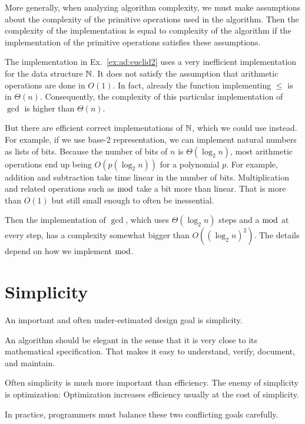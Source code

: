 More generally, when analyzing algorithm complexity, we must make assumptions about the complexity of the primitive operations used in the algorithm.
Then the complexity of the implementation is equal to complexity of the algorithm if the implementation of the primitive operations satisfies these assumptions.

\begin{example}\label{ex:ad:euclid3}
The implementation in Ex.~\ref{ex:ad:euclid2} uses a very inefficient implementation for the data structure $\mathbb{N}$.
It does not satisfy the assumption that arithmetic operations are done in $O(1)$.
In fact, already the function implementing $\leq$ is in $\Theta(n)$.
Consequently, the complexity of this particular implementation of $\gcd$ is higher than $\Theta(n)$.
\medskip

But there are efficient correct implementations of $\mathbb{N}$, which we could use instead.
For example, if we use base-$2$ representation, we can implement natural numbers as lists of bits.
Because the number of bits of $n$ is $\Theta(\log_2 n)$, most arithmetic operations end up being $O(p(\log_2 n))$ for a polynomial $p$.
For example, addition and subtraction take time linear in the number of bits.
Multiplication and related operations such as $\mathop{\mathrm{mod}}$ take a bit more than linear.
That is more than $O(1)$ but still small enough to often be inessential.

Then the implementation of $\gcd$, which uses $\Theta(\log_2 n)$ steps and a $\mathop{\mathrm{mod}}$ at every step, has a complexity somewhat bigger than $O((\log_2 n)^2)$.
The details depend on how we implement $\mathop{\mathrm{mod}}$.
\end{example}

\section{Simplicity}

An important and often under-estimated design goal is simplicity.

An algorithm should be elegant in the sense that it is very close to its mathematical specification.
That makes it easy to understand, verify, document, and maintain.

Often simplicity is much more important than efficiency.
The enemy of simplicity is optimization: Optimization increases efficiency usually at the cost of simplicity.
\medskip

In practice, programmers must balance these two conflicting goals carefully.

